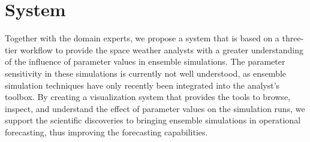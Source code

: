 \documentclass[journal]{vgtc}                %
\begin{document}


\section{System}
Together with the domain experts, we propose a system that is based on a three-tier workflow to provide the space weather analysts with a greater understanding of the influence of parameter values in ensemble simulations. The parameter sensitivity in these simulations is currently not well understood, as ensemble simulation techniques have only recently been integrated into the analyst's toolbox. By creating a visualization system that provides the tools to browse, inspect, and understand the effect of parameter values on the simulation runs, we support the scientific discoveries to bringing ensemble simulations in operational forecasting, thus improving the forecasting capabilities.
\end{document}
